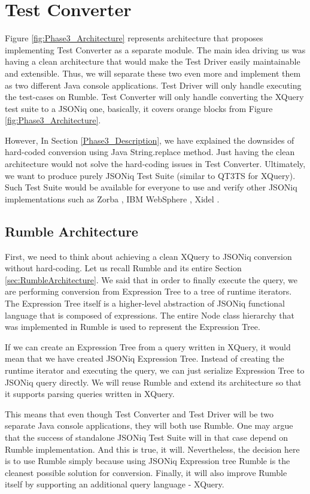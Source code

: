 
\chapter{Test Converter}
Figure \ref{fig:Phase3_Architecture} represents architecture that proposes implementing Test Converter as a separate module. The main idea driving us was having a clean architecture that would make the Test Driver easily maintainable and extensible. Thus, we will separate these two even more and implement them as two different Java console applications. Test Driver will only handle executing the test-cases on Rumble. Test Converter will only handle converting the XQuery test suite to a JSONiq one, basically, it covers orange blocks from Figure \ref{fig:Phase3_Architecture}. 

However, In Section \ref{Phase3_Description}, we have explained the downsides of hard-coded conversion using Java String.replace method. Just having the clean architecture would not solve the hard-coding issues in Test Converter. Ultimately, we want to produce purely JSONiq Test Suite (similar to QT3TS for XQuery). Such Test Suite would be available for everyone to use and verify other JSONiq implementations such as Zorba \cite{Zorba}, IBM WebSphere \cite{WebSphere}, Xidel \cite{Xidel}.

\section{Rumble Architecture}
First, we need to think about achieving a clean XQuery to JSONiq conversion without hard-coding. Let us recall Rumble and its entire Section \ref{sec:RumbleArchitecture}. We said that in order to finally execute the query, we are performing conversion from Expression Tree to a tree of runtime iterators. The Expression Tree itself is a higher-level abstraction of JSONiq functional language that is composed of expressions. The entire Node class hierarchy that was implemented in Rumble is used to represent the Expression Tree.

If we can create an Expression Tree from a query written in XQuery, it would mean that we have created JSONiq Expression Tree. Instead of creating the runtime iterator and executing the query, we can just serialize Expression Tree to JSONiq query directly. We will reuse Rumble and extend its architecture so that it supports parsing queries written in XQuery. 

This means that even though Test Converter and Test Driver will be two separate Java console applications, they will both use Rumble. One may argue that the success of standalone JSONiq Test Suite will in that case depend on Rumble implementation. And this is true, it will. Nevertheless, the decision here is to use Rumble simply because using JSONiq Expression tree Rumble is the cleanest possible solution for conversion. Finally, it will also improve Rumble itself by supporting an additional query language - XQuery.

